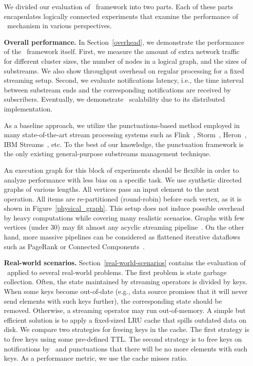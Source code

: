 We divided our evaluation of \tracker\ framework into two parts. Each of these parts encapsulates logically connected experiments that examine the performance of \tracker\ mechanism in various perspectives.

{\noindent \bf Overall performance.} In Section~\ref{overhead}, we demonstrate the performance of the \tracker\ framework itself. First, we measure the amount of extra network traffic for different cluster sizes, the number of nodes in a logical graph, and the sizes of substreams. We also show throughput overhead on regular processing for a fixed streaming setup. Second, we evaluate notifications latency, i.e., the time interval between substream ends and the corresponding notifications are received by subscribers.  Eventually, we demonstrate \tracker\ scalability due to its distributed implementation. 

As a baseline approach, we utilize the punctuations-based method employed in many state-of-the-art stream processing systems such as Flink~\cite{Carbone:2017:SMA:3137765.3137777}, Storm~\cite{apache:storm:state}, Heron~\cite{Kulkarni:2015:THS:2723372.2742788}, IBM Streams~\cite{jacques2016consistent}, etc. To the best of our knowledge, the punctuation framework is the only existing general-purpose substreams management technique.

An execution graph for this block of experiments should be flexible in order to analyze performance with less bias on a specific task. We use synthetic directed graphs of various lengths. All vertices pass an input element to the next operation. All items are re-partitioned (round-robin) before each vertex, as it is shown in Figure~\ref{physical_graph}. This setup does not induce possible overhead by heavy computations while covering many realistic scenarios. Graphs with few vertices (under 30) may fit almost any acyclic streaming pipeline~\cite{akidau2018streaming}. On the other hand, more massive pipelines can be considered as flattened iterative dataflows such as PageRank or Connected Components~\cite{Murray:2013:NTD:2517349.2522738, xu2016efficient}.

{\noindent \bf Real-world scenarios.} Section~\ref{real-world-scenarios} contains the evaluation of \tracker\ applied to several real-world problems. The first problem is state garbage collection. Often, the state maintained by streaming operators is divided by keys. When some keys become out-of-date (e.g., data source promises that it will never send elements with such keys further), the corresponding state should be removed. Otherwise, a streaming operator may run out-of-memory. A simple but efficient solution is to apply a fixed-sized LRU cache that spills outdated data on disk. We compare two strategies for freeing keys in the cache. The first strategy is to free keys using some pre-defined TTL. The second strategy is to free keys on notifications by \tracker\ and punctuations that there will be no more elements with such keys. As a performance metric, we use the cache misses ratio.

